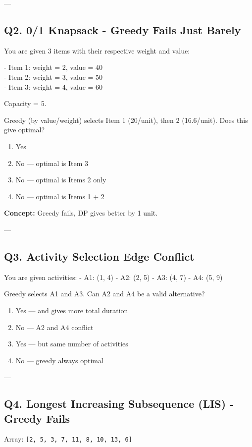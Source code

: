 ---

\subsection*{Q2. 0/1 Knapsack - Greedy Fails Just Barely}
You are given 3 items with their respective weight and value:

\begin{center}
- Item 1: weight = 2, value = 40\\
- Item 2: weight = 3, value = 50\\
- Item 3: weight = 4, value = 60  
\end{center}

Capacity = 5.

Greedy (by value/weight) selects Item 1 (20/unit), then 2 (16.6/unit).  
Does this give optimal?

\begin{enumerate}[label=(\alph*)]
    \item Yes 
    \item No — optimal is Item 3 
    \item No — optimal is Items 2 only 
    \item No — optimal is Items 1 + 2
\end{enumerate}

\textbf{Concept:} Greedy fails, DP gives better by 1 unit.

---

\subsection*{Q3. Activity Selection Edge Conflict}
You are given activities:
- A1: (1, 4)  
- A2: (2, 5)  
- A3: (4, 7)  
- A4: (5, 9)

Greedy selects A1 and A3.  
Can A2 and A4 be a valid alternative?

\begin{enumerate}[label=(\alph*)]
    \item Yes — and gives more total duration 
    \item No — A2 and A4 conflict 
    \item Yes — but same number of activities 
    \item No — greedy always optimal
\end{enumerate}

---

\subsection*{Q4. Longest Increasing Subsequence (LIS) - Greedy Fails}
Array: \texttt{[2, 5, 3, 7, 11, 8, 10, 13, 6]}


